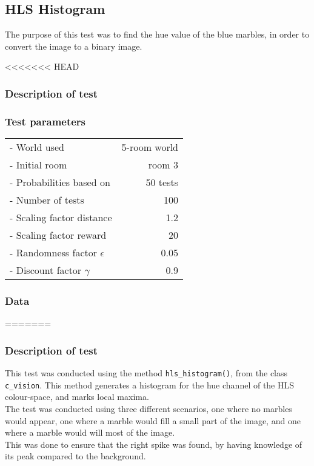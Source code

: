 \documentclass[../Head/Main.tex]{subfiles}
\begin{document}
\subsection{HLS Histogram}
\label{subsec:test_HLS_hist}
The purpose of this test was to find the hue value of the blue marbles, in order to convert the image to a binary image. 

<<<<<<< HEAD
\subsubsection*{Description of test}



\subsubsection*{Test parameters}
\begin{minipage}[c]{0.35\textwidth}
	\begin{tabular}{l r}
	- World used                   & 5-room world\\
	- Initial room                 & room 3\\	
	- Probabilities based on       & 50 tests\\	
	- Number of tests              & 100\\
	- Scaling factor distance      & 1.2\\
	- Scaling factor reward        & 20\\
	- Randomness factor $\epsilon$ & 0.05\\
	- Discount factor $\gamma$     & 0.9\\
	\end{tabular}
\end{minipage}	

\subsubsection*{Data}
=======
\subsubsection{Description of test}
This test was conducted using the method \texttt{hls\_histogram()}, from the class \texttt{c\_vision}. This method generates a histogram for the hue channel of the HLS colour-space, and marks local maxima.\\
The test was conducted using three different scenarios, one where no marbles would appear, one where a marble would fill a small part of the image, and one where a marble would will most of the image.\\
This was done to ensure that the right spike was found, by having knowledge of its peak compared to the background.  
\end{document}
